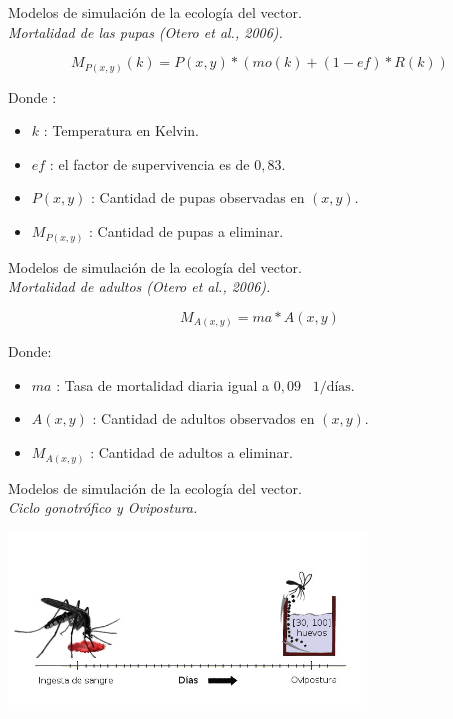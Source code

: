\begin{frame}[c]{Modelos de simulación de la ecología del vector.\\\textit{Mortalidad de las pupas (Otero et al., 2006).}}
  \begin{center}
    \begin{equation}
        M_{P(x,y)}(k) = P(x,y) * (mo(k) + (1 - ef) * R(k))
    \end{equation}
  \end{center}
  Donde :
    \begin{itemize}
      \item $k$ : Temperatura en Kelvin.
      \item $ef$ : el factor de supervivencia es de $0,83$.
      \item $P(x, y)$ : Cantidad de pupas observadas en $(x,y)$.
      \item $M_{P(x,y)}$ : Cantidad de pupas a eliminar.
    \end{itemize}
\end{frame}

\begin{frame}[c]{Modelos de simulación de la ecología del vector.\\\textit{Mortalidad de adultos (Otero et al., 2006).}}
  \begin{center}
    \begin{equation}
        M_{A(x,y)} = ma * A(x,y)
    \end{equation}
  \end{center}
  Donde:
    \begin{itemize}
      \item $ma$ : Tasa de mortalidad diaria igual a $0,09$ \ $1/\text{días}$.
      \item $A(x, y)$ : Cantidad de adultos observados en $(x,y)$.
      \item $M_{A(x,y)}$ : Cantidad de adultos a eliminar.
    \end{itemize}
\end{frame}


\begin{frame}[c]{Modelos de simulación de la ecología del vector.\\\textit{Ciclo gonotrófico y Ovipostura.}}
  \begin{center}
      \includegraphics[width=9.5cm]{./graphics/cliclo-gonotrofico-tiempo.jpg}
  \end{center}
\end{frame}

